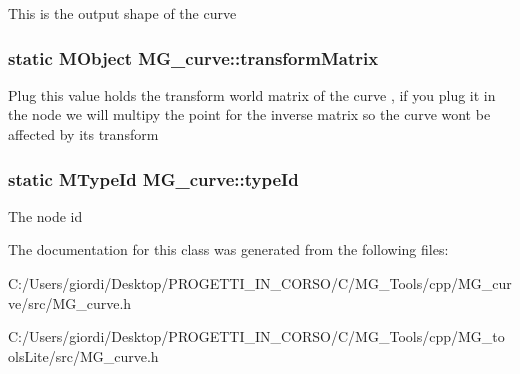 This is the output shape of the curve \hypertarget{class_m_g__curve_a03d8b8f59871792f08bc09ad64447354}{
\subsubsection[{transform\-Matrix}]{\setlength{\rightskip}{0pt plus 5cm}static M\-Object M\-G\-\_\-curve\-::transform\-Matrix\hspace{0.3cm}{\ttfamily [static]}}}\label{class_m_g__curve_a03d8b8f59871792f08bc09ad64447354}
Plug this value holds the transform world matrix of the curve , if you plug it in the node we will multipy the point for the inverse matrix so the curve wont be affected by its transform \hypertarget{class_m_g__curve_aaefd29164297e9889c41608b8b7f2542}{
\subsubsection[{type\-Id}]{\setlength{\rightskip}{0pt plus 5cm}static M\-Type\-Id M\-G\-\_\-curve\-::type\-Id\hspace{0.3cm}{\ttfamily [static]}}}\label{class_m_g__curve_aaefd29164297e9889c41608b8b7f2542}
The node id 

The documentation for this class was generated from the following files\-:\begin{DoxyCompactItemize}
\item 
C\-:/\-Users/giordi/\-Desktop/\-P\-R\-O\-G\-E\-T\-T\-I\-\_\-\-I\-N\-\_\-\-C\-O\-R\-S\-O/\-C/\-M\-G\-\_\-\-Tools/cpp/\-M\-G\-\_\-curve/src/M\-G\-\_\-curve.\-h\item 
C\-:/\-Users/giordi/\-Desktop/\-P\-R\-O\-G\-E\-T\-T\-I\-\_\-\-I\-N\-\_\-\-C\-O\-R\-S\-O/\-C/\-M\-G\-\_\-\-Tools/cpp/\-M\-G\-\_\-tools\-Lite/src/M\-G\-\_\-curve.\-h\end{DoxyCompactItemize}
